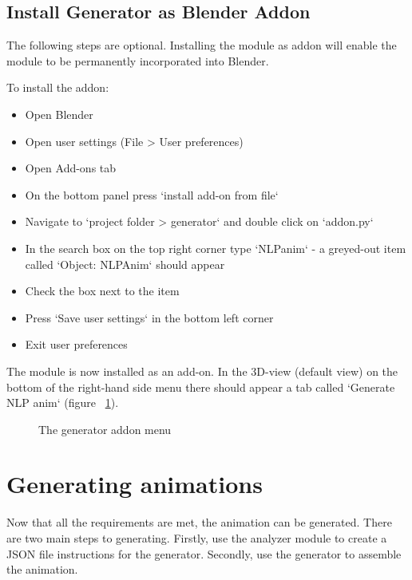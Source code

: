\subsection{Install Generator as Blender Addon \label{sec:installaddon}}
The following steps are optional. Installing the module as addon will enable the module to be permanently incorporated into Blender.

\noindent To install the addon:
\begin{itemize}
	\item Open Blender
	\item Open user settings (File > User preferences)
	\item Open Add-ons tab
	\item On the bottom panel press `install add-on from file`
	\item Navigate to `project folder > generator` and double click on `addon.py`
	\item In the search box on the top right corner type `NLPanim` - a greyed-out item called `Object: NLPAnim` should appear
	\item Check the box next to the item
	\item Press `Save user settings` in the bottom left corner
	\item Exit user preferences
\end{itemize}

\noindent The module is now installed as an add-on. In the 3D-view (default view) on the bottom of the right-hand side menu there should appear a tab called `Generate NLP anim` (figure ~\ref{fig:installedaddon}).
	
\begin{figure}[!ht]
	\centerline{}
	\caption{The generator addon menu}\label{fig:installedaddon}
\end{figure}

\section{Generating animations}
\noindent Now that all the requirements are met, the animation can be generated. There are two main steps to generating. Firstly, use the analyzer module to create a JSON file instructions for the generator. Secondly, use the generator to assemble the animation.

